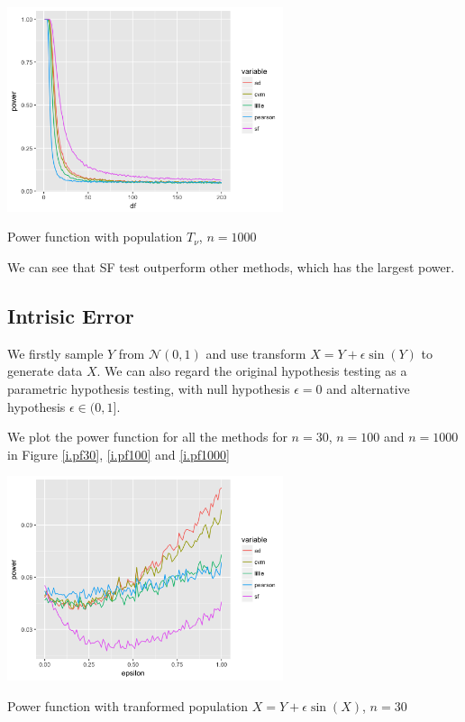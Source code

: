 \documentclass[twoside]{article}
\begin{document}
\begin{center}
\makeatletter
\def\@captype{figure}
\makeatother
\includegraphics [height=6cm]{code/t.1000.png}
\caption{Power function with population $T_\nu$, $n=1000$}
\label{t.pf1000}
\end{center}

We can see that SF test outperform other methods, which has the largest power.

\subsection{Intrisic Error}

We firstly sample $Y$ from $\mathcal{N}(0, 1)$ and use transform $X=Y+\epsilon\sin(Y)$ to generate data $X$. We can also regard the original hypothesis testing as a parametric hypothesis testing, with null hypothesis $\epsilon=0$ and alternative hypothesis $\epsilon \in (0,1]$. 

We plot the power function for all the methods for $n=30$, $n=100$ and $n=1000$ in Figure \ref{i.pf30}, \ref{i.pf100} and \ref{i.pf1000}

\begin{center}
\makeatletter
\def\@captype{figure}
\makeatother
\includegraphics [height=6cm]{code/noise.30.png}
\caption{Power function with tranformed population $X=Y+\epsilon\sin(X)$, $n=30$}
\label{i.pf30}
\end{center}
\end{document}
